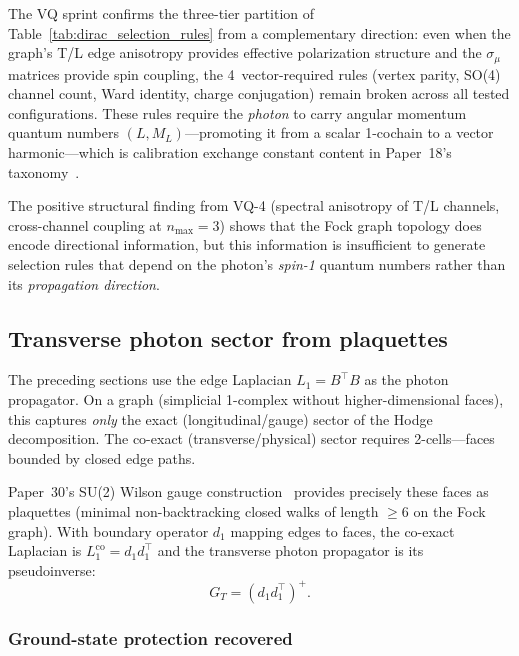 \documentclass[11pt]{article}
\begin{document}
The VQ sprint confirms the three-tier partition of
Table~\ref{tab:dirac_selection_rules} from a complementary direction:
even when the graph's T/L edge anisotropy provides effective polarization
structure and the $\sigma_\mu$ matrices provide spin coupling, the
4~vector-required rules (vertex parity, SO(4) channel count, Ward
identity, charge conjugation) remain broken across all tested
configurations.  These rules require the \emph{photon} to carry angular
momentum quantum numbers $(L, M_L)$---promoting it from a scalar
1-cochain to a vector harmonic---which is calibration exchange constant
content in Paper~18's taxonomy~\cite{paper18}.

The positive structural finding from VQ-4 (spectral anisotropy of T/L
channels, cross-channel coupling at $n_{\max} = 3$) shows that the Fock
graph topology does encode directional information, but this information
is insufficient to generate selection rules that depend on the photon's
\emph{spin-1} quantum numbers rather than its \emph{propagation direction}.

\subsection{Transverse photon sector from plaquettes}
\label{sec:transverse_photon}

The preceding sections use the edge Laplacian $L_1 = B^\top B$ as
the photon propagator.  On a graph (simplicial 1-complex without
higher-dimensional faces), this captures \emph{only} the exact
(longitudinal/gauge) sector of the Hodge decomposition.  The co-exact
(transverse/physical) sector requires 2-cells---faces bounded by closed
edge paths.

Paper~30's SU(2) Wilson gauge construction~\cite{paper30} provides
precisely these faces as plaquettes (minimal non-backtracking closed
walks of length $\geq 6$ on the Fock graph).  With
boundary operator $d_1$ mapping edges to faces, the co-exact
Laplacian is $L_1^{\mathrm{co}} = d_1 d_1^\top$ and the transverse
photon propagator is its pseudoinverse:
\begin{equation}
  G_T = (d_1 d_1^\top)^+.
  \label{eq:transverse_propagator}
\end{equation}

\subsubsection{Ground-state protection recovered}
\end{document}
